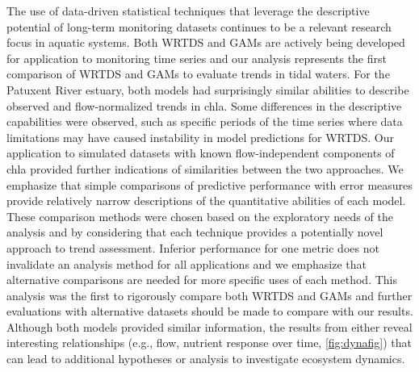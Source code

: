 \documentclass[letterpaper,12pt,oneside]{article}\usepackage[]{graphicx}\usepackage[]{color}
\begin{document}
The use of data-driven statistical techniques that leverage the descriptive potential of long-term monitoring datasets continues to be a relevant research focus in aquatic systems.  Both \ac{WRTDS} and \acp{GAM} are actively being developed for application to monitoring time series and our analysis represents the first comparison of \ac{WRTDS} and \acp{GAM} to evaluate trends in tidal waters.  For the Patuxent River estuary, both models had surprisingly similar abilities to describe observed and flow-normalized trends in \ac{chla}.  Some differences in the descriptive capabilities were observed, such as specific periods of the time series where data limitations may have caused instability in model predictions for \ac{WRTDS}.  Our application to simulated datasets with known flow-independent components of \ac{chla} provided further indications of similarities between the two approaches. We emphasize that simple comparisons of predictive performance with error measures provide relatively narrow descriptions of the quantitative abilities of each model. These comparison methods were chosen based on the exploratory needs of the analysis and by considering that each technique provides a potentially novel approach to trend assessment.  Inferior performance for one metric does not invalidate an analysis method for all applications and we emphasize that alternative comparisons are needed for more specific uses of each method. This analysis was the first to rigorously compare both \ac{WRTDS} and \acp{GAM} and further evaluations with alternative datasets should be made to compare with our results. Although both models provided similar information, the results from either reveal interesting relationships (e.g., flow, nutrient response over time, \cref{fig:dynafig}) that can lead to additional hypotheses or analysis to investigate ecosystem dynamics. 
\end{document}
